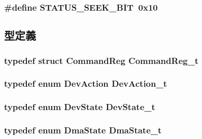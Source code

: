 \label{ide__disk_8hh_ac3959778b8b4ee593c16fa33a06d844c}
\hypertarget{ide__disk_8hh_a6d24123c25308f8d0b135602dca13b8d}{
\subsubsection[{STATUS\_\-SEEK\_\-BIT}]{\setlength{\rightskip}{0pt plus 5cm}\#define STATUS\_\-SEEK\_\-BIT~0x10}}
\label{ide__disk_8hh_a6d24123c25308f8d0b135602dca13b8d}


\subsection{型定義}
\hypertarget{ide__disk_8hh_af4010b661f64b0062097e418091f5d62}{
\subsubsection[{CommandReg\_\-t}]{\setlength{\rightskip}{0pt plus 5cm}typedef struct {\bf CommandReg}  {\bf CommandReg\_\-t}}}
\label{ide__disk_8hh_af4010b661f64b0062097e418091f5d62}
\hypertarget{ide__disk_8hh_ab9a7252f05d40d629a2b3e780862846c}{
\subsubsection[{DevAction\_\-t}]{\setlength{\rightskip}{0pt plus 5cm}typedef enum {\bf DevAction}  {\bf DevAction\_\-t}}}
\label{ide__disk_8hh_ab9a7252f05d40d629a2b3e780862846c}
\hypertarget{ide__disk_8hh_abe49db4804c1744e30c8df026681eaf0}{
\subsubsection[{DevState\_\-t}]{\setlength{\rightskip}{0pt plus 5cm}typedef enum {\bf DevState}  {\bf DevState\_\-t}}}
\label{ide__disk_8hh_abe49db4804c1744e30c8df026681eaf0}
\hypertarget{ide__disk_8hh_a398a1d251e78562f1eccfb43ad5fdf49}{
\subsubsection[{DmaState\_\-t}]{\setlength{\rightskip}{0pt plus 5cm}typedef enum {\bf DmaState}  {\bf DmaState\_\-t}}}

